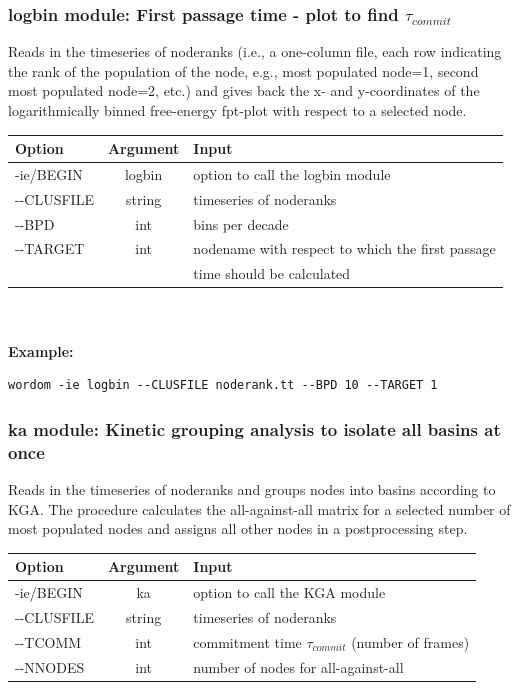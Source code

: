 \documentclass[11pt,twoside,onecolumn,a4paper,openright,notitlepage]{book}[2001/04/21]
\begin{document}
\subsubsection{logbin module: First passage time - plot to find $\tau_{commit}$}

Reads in the timeseries of noderanks (i.e., a one-column file, each row indicating the rank of the population of the node, e.g., most populated node=1, second most populated node=2, etc.) and gives back the x- and y-coordinates of the logarithmically binned free-energy fpt-plot with respect to a selected node.\\

\begin{tabular}{l|c|l}
Option & Argument & Input \\
\hline
-ie/BEGIN		 & logbin & option to call the logbin module\\
-{}-CLUSFILE & string & timeseries of noderanks \\
-{}-BPD      & int    & bins per decade \\
-{}-TARGET   & int    & nodename with respect to which the first passage \\
 & & time should be calculated \\
\end{tabular}\\
\\

{\bf Example:}

\begin{verbatim}wordom -ie logbin --CLUSFILE noderank.tt --BPD 10 --TARGET 1 \end{verbatim}

\subsubsection{ka module: Kinetic grouping analysis to isolate all basins at once}

Reads in the timeseries of noderanks and groups nodes into basins according to KGA. The procedure calculates the all-against-all matrix for a selected number of most populated nodes and assigns all other nodes in a postprocessing step.\\

\begin{tabular}{l|c|l}
Option & Argument & Input \\
\hline
-ie/BEGIN 	 & ka & option to call the KGA module\\
-{}-CLUSFILE & string & timeseries of noderanks \\
-{}-TCOMM    & int    & commitment time $\tau_{commit}$ (number of frames) \\
-{}-NNODES   & int    & number of nodes for all-against-all \\
\end{tabular}\\
\\
\end{document}
